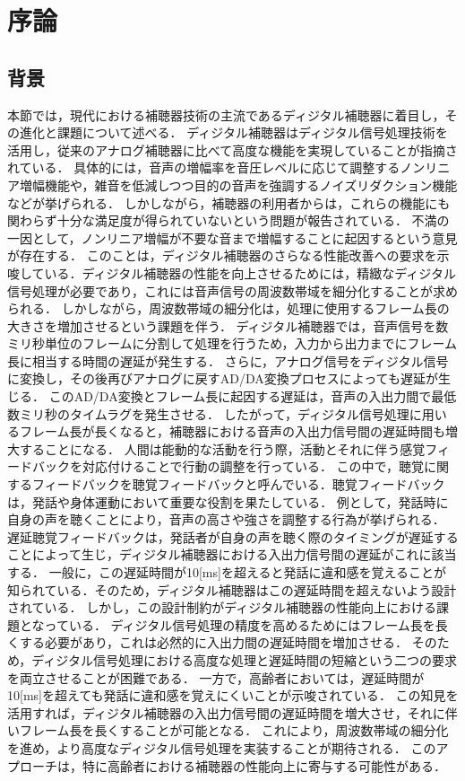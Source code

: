 \chapter{序論}
\section{背景}
本節では，現代における補聴器技術の主流であるディジタル補聴器に着目し，その進化と課題について述べる．
ディジタル補聴器はディジタル信号処理技術を活用し，従来のアナログ補聴器に比べて高度な機能を実現していることが指摘されている\cite{EaringAids_20}\cite{EaringAids-2}．
具体的には，音声の増幅率を音圧レベルに応じて調整するノンリニア増幅機能や，雑音を低減しつつ目的の音声を強調するノイズリダクション機能などが挙げられる．
しかしながら，補聴器の利用者からは，これらの機能にも関わらず十分な満足度が得られていないという問題が報告されている\cite{Manzokudo}．
不満の一因として，ノンリニア増幅が不要な音まで増幅することに起因するという意見が存在する．
このことは，ディジタル補聴器のさらなる性能改善への要求を示唆している．ディジタル補聴器の性能を向上させるためには，精緻なディジタル信号処理が必要であり，これには音声信号の周波数帯域を細分化することが求められる．
しかしながら，周波数帯域の細分化は，処理に使用するフレーム長の大きさを増加させるという課題を伴う．
ディジタル補聴器では，音声信号を数ミリ秒単位のフレームに分割して処理を行うため，入力から出力までにフレーム長に相当する時間の遅延が発生する．
さらに，アナログ信号をディジタル信号に変換し，その後再びアナログに戻すAD/DA変換プロセスによっても遅延が生じる．
このAD/DA変換とフレーム長に起因する遅延は，音声の入出力間で最低数ミリ秒のタイムラグを発生させる．
したがって，ディジタル信号処理に用いるフレーム長が長くなると，補聴器における音声の入出力信号間の遅延時間も増大することになる．
人間は能動的な活動を行う際，活動とそれに伴う感覚フィードバックを対応付けることで行動の調整を行っている．
この中で，聴覚に関するフィードバックを聴覚フィードバックと呼んでいる\cite{DAF}．聴覚フィードバックは，発話や身体運動において重要な役割を果たしている．
例として，発話時に自身の声を聴くことにより，音声の高さや強さを調整する行為が挙げられる．
遅延聴覚フィードバックは，発話者が自身の声を聴く際のタイミングが遅延することによって生じ，ディジタル補聴器における入出力信号間の遅延がこれに該当する．
一般に，この遅延時間が10[ms]を超えると発話に違和感を覚えることが知られている\cite{DelayTime-ninnchi}．そのため，ディジタル補聴器はこの遅延時間を超えないよう設計されている\cite{EaringAids_20}．
しかし，この設計制約がディジタル補聴器の性能向上における課題となっている．
ディジタル信号処理の精度を高めるためにはフレーム長を長くする必要があり，これは必然的に入出力間の遅延時間を増加させる．
そのため，ディジタル信号処理における高度な処理と遅延時間の短縮という二つの要求を両立させることが困難である．
一方で，高齢者においては，遅延時間が10[ms]を超えても発話に違和感を覚えにくいことが示唆されている\cite{shigematu-toukyoushibu}．
この知見を活用すれば，ディジタル補聴器の入出力信号間の遅延時間を増大させ，それに伴いフレーム長を長くすることが可能となる．
これにより，周波数帯域の細分化を進め，より高度なディジタル信号処理を実装することが期待される．
このアプローチは，特に高齢者における補聴器の性能向上に寄与する可能性がある．

